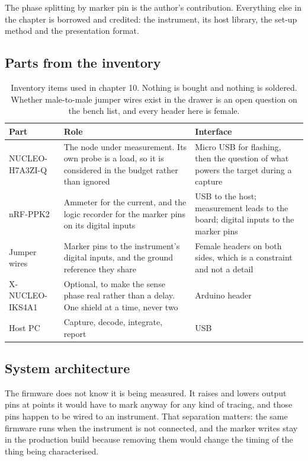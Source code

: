 The phase splitting by marker pin is the author's contribution. Everything else
in the chapter is borrowed and credited: the instrument, its host library, the
set-up method and the presentation format.

\subsection*{Parts from the inventory}

\begin{table}[H]\centering\small
\begin{tabular}{p{40mm}p{66mm}p{40mm}}
\toprule
Part & Role & Interface \\
\midrule
NUCLEO-H7A3ZI-Q & The node under measurement. Its own probe is a load, so it is considered in the budget rather than ignored & Micro USB for flashing, then the question of what powers the target during a capture \\
nRF-PPK2 & Ammeter for the current, and the logic recorder for the marker pins on its digital inputs & USB to the host; measurement leads to the board; digital inputs to the marker pins \\
Jumper wires & Marker pins to the instrument's digital inputs, and the ground reference they share & Female headers on both sides, which is a constraint and not a detail \\
X-NUCLEO-IKS4A1 & Optional, to make the sense phase real rather than a delay. One shield at a time, never two & Arduino header \\
Host PC & Capture, decode, integrate, report & USB \\
\bottomrule
\end{tabular}
\caption{Inventory items used in chapter 10. Nothing is bought and nothing is soldered. Whether male-to-male jumper wires exist in the drawer is an open question on the bench list, and every header here is female.}
\end{table}

\subsection*{System architecture}


The firmware does not know it is being measured. It raises and lowers output
pins at points it would have to mark anyway for any kind of tracing, and those
pins happen to be wired to an instrument. That separation matters: the same
firmware runs when the instrument is not connected, and the marker writes stay
in the production build because removing them would change the timing of the
thing being characterised.


